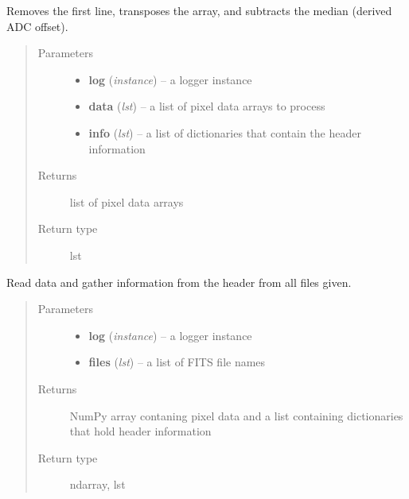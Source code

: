 \documentclass[a4paper,11pt,english]{sphinxmanual}
\begin{document}
\begin{fulllineitems}
\label{analysis:analysis.analyseGaiaBAMCosmicRayData.preProcessData}
Removes the first line, transposes the array, and subtracts the median (derived ADC offset).
\begin{quote}\begin{description}
\item[{Parameters}] \leavevmode\begin{itemize}
\item {} 
\textbf{log} (\emph{instance}) -- a logger instance

\item {} 
\textbf{data} (\emph{lst}) -- a list of pixel data arrays to process

\item {} 
\textbf{info} (\emph{lst}) -- a list of dictionaries that contain the header information

\end{itemize}

\item[{Returns}] \leavevmode
list of pixel data arrays

\item[{Return type}] \leavevmode
lst

\end{description}\end{quote}

\end{fulllineitems}


\begin{fulllineitems}
\label{analysis:analysis.analyseGaiaBAMCosmicRayData.readData}
Read data and gather information from the header from all files given.
\begin{quote}\begin{description}
\item[{Parameters}] \leavevmode\begin{itemize}
\item {} 
\textbf{log} (\emph{instance}) -- a logger instance

\item {} 
\textbf{files} (\emph{lst}) -- a list of FITS file names

\end{itemize}

\item[{Returns}] \leavevmode
NumPy array contaning pixel data and a list containing dictionaries that hold header information

\item[{Return type}] \leavevmode
ndarray, lst

\end{description}\end{quote}

\end{fulllineitems}
\end{document}
